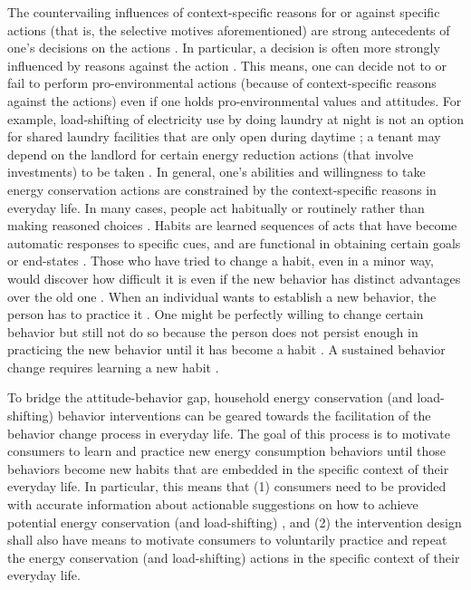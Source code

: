 The countervailing influences of context-specific reasons for or against specific actions (that is, the selective motives aforementioned) are strong antecedents of one's decisions on the actions  \citep{Claudy2013}. In particular, a decision is often more strongly influenced by reasons against the action  \citep{Claudy2013,Berthou2013}. This means, one can decide not to or fail to perform pro-environmental actions (because of context-specific reasons against the actions) even if one holds pro-environmental values and attitudes. For example, load-shifting of electricity use by doing laundry at night is not an option for shared laundry facilities that are only open during daytime  \citep{Entwistle2015}; a tenant may depend on the landlord for certain energy reduction actions (that involve investments) to be taken  \citep{Dillahunt2010}. In general, one's abilities and willingness to take energy conservation actions are constrained by the context-specific reasons in everyday life. 
In many cases, people act habitually or routinely rather than making reasoned choices  \citep{Steg2009,Berthou2013}. Habits are learned sequences of acts that have become automatic responses to specific cues, and are functional in obtaining certain goals or end-states  \citep{Verplanken1999}. Those who have tried to change a habit, even in a minor way, would discover how difficult it is even if the new behavior has distinct advantages over the old one  \citep{Kollmuss2002}. When an individual wants to establish a new behavior, the person has to practice it  \citep{Kollmuss2002}. One might be perfectly willing to change certain behavior but still not do so because the person does not persist enough in practicing the new behavior until it has become a habit  \citep{Kollmuss2002}. A sustained behavior change requires learning a new habit  \citep{Dillahunt:2009:GEU:1620545.1620583}. 

To bridge the attitude-behavior gap, household energy conservation (and load-shifting) behavior interventions can be geared towards the facilitation of the behavior change process in everyday life. The goal of this process is to motivate consumers to learn and practice new energy consumption behaviors until those behaviors become new habits that are embedded in the specific context of their everyday life. In particular, this means that (1) consumers need to be provided with accurate information about actionable suggestions on how to achieve potential energy conservation (and load-shifting) , and (2) the intervention design shall also have means to motivate consumers to voluntarily practice and repeat the energy conservation (and load-shifting) actions in the specific context of their everyday life.  
